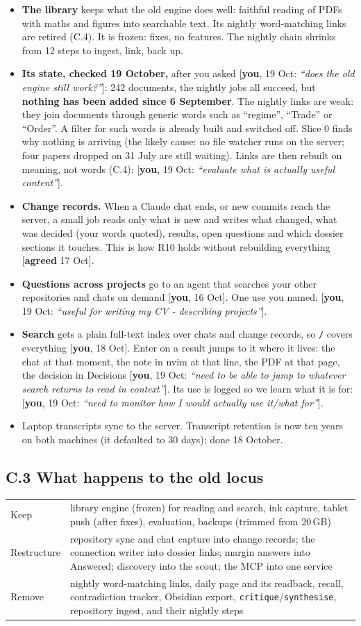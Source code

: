 \documentclass[10pt]{extarticle}
\newcommand{\you}[2]{{\small[\textbf{you}, #1: \textit{``#2''}]}}
\newcommand{\youx}[1]{{\small[\textbf{you}, #1]}}
\newcommand{\agreed}[1]{{\small[\textbf{agreed} #1]}}
\newcommand{\Sub}[1]{\subsection*{#1}}
\begin{document}
\begin{itemize}
\item \textbf{The library} keeps what the old engine does well: faithful reading of PDFs with maths and figures into searchable text. Its nightly word-matching links are retired (C.4). It is frozen: fixes, no features. The nightly chain shrinks from 12 steps to ingest, link, back up.
\item \textbf{Its state, checked 19 October,} after you asked \you{19 Oct}{does the old engine still work?}: 242 documents, the nightly jobs all succeed, but \textbf{nothing has been added since 6 September}. The nightly links are weak: they join documents through generic words such as ``regime'', ``Trade'' or ``Order''. A filter for such words is already built and switched off. Slice 0 finds why nothing is arriving (the likely cause: no file watcher runs on the server; four papers dropped on 31 July are still waiting). Links are then rebuilt on meaning, not words (C.4): \you{19 Oct}{evaluate what is actually useful content}.
\item \textbf{Change records.} When a Claude chat ends, or new commits reach the server, a small job reads only what is new and writes what changed, what was decided (your words quoted), results, open questions and which dossier sections it touches. This is how R10 holds without rebuilding everything \agreed{17 Oct}.
\item \textbf{Questions across projects} go to an agent that searches your other repositories and chats on demand \youx{16 Oct}. One use you named: \you{19 Oct}{useful for writing my CV - describing projects}.
\item \textbf{Search} gets a plain full-text index over chats and change records, so \texttt{/} covers everything \youx{18 Oct}. Enter on a result jumps to it where it lives: the chat at that moment, the note in nvim at that line, the PDF at that page, the decision in Decisions \you{19 Oct}{need to be able to jump to whatever search returns to read in context}. Its use is logged so we learn what it is for: \you{19 Oct}{need to monitor how I would actually use it/what for}.
\item Laptop transcripts sync to the server. Transcript retention is now ten years on both machines (it defaulted to 30 days); done 18 October.
\end{itemize}

\Sub{C.3 What happens to the old locus}
\begin{tabularx}{\linewidth}{@{}l Y@{}}
\toprule
Keep & library engine (frozen) for reading and search, ink capture, tablet push (after fixes), evaluation, backups (trimmed from 20\,GB) \\
Restructure & repository sync and chat capture into change records; the connection writer into dossier links; margin answers into Answered; discovery into the scout; the MCP into one service \\
Remove & nightly word-matching links, daily page and its readback, recall, contradiction tracker, Obsidian export, \texttt{critique}/\texttt{synthesise}, repository ingest, and their nightly steps \\
\bottomrule
\end{tabularx}
\end{document}
